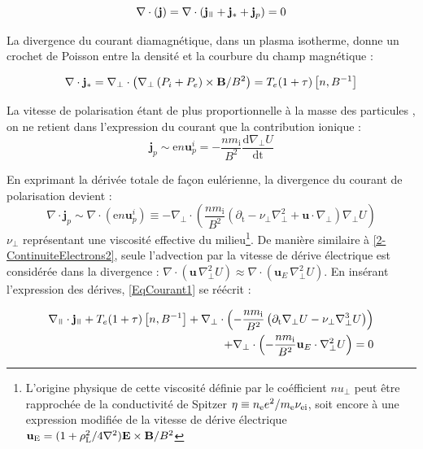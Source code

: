 \begin{refsection}
\begin{equation}
\label{EqCourant1}
\nabla\cdot\left(\mathbf{j}\right) = 
\nabla\cdot\left(\mathbf{j}_\para+\mathbf{j}_*+\mathbf{j}_p\right)
= 0
\end{equation}

La divergence du courant diamagnétique, dans un plasma isotherme, donne un
crochet de Poisson entre la densité et la courbure du champ magnétique :

\begin{equation}
\nabla\cdot\mathbf{j}_*=
\nabla_\perp\cdot\left(\nabla_\perp\left(
P_i+P_e\right)\times\mathbf{B}/B^2\right) =
T_e(1+\tau)\left[n,B^{{-1}}\right]
\end{equation}

La vitesse de polarisation étant de plus
proportionnelle à la masse des particules , on ne
retient dans l'expression du courant que la contribution ionique :
\begin{equation}
\mathbf{j}_p\sim\text{e}n\mathbf{u}^i_p=-\frac{nm_\text{i}}{B^2}\frac{\text{d}\nabla_\perp
U}{\text{dt}}
\end{equation}

En exprimant la dérivée totale de
façon eulérienne, la divergence du courant de polarisation devient :
\begin{equation}
\nabla\cdot\mathbf{j}_p\sim\nabla\cdot\left(\text{e}n\mathbf{u}^i_p\right)\equiv
-\nabla_\perp\cdot\left(\frac{nm_\text{i}}{B^2}\left(\partial_\text{t} -
\nu_\perp \nabla_\perp^2 +
\mathbf{u}\cdot\nabla_\perp\right)\nabla_\perp U\right)
\end{equation}
$\nu_\perp$ représentant une viscosité effective du milieu\footnote{L'origine
physique de cette viscosité définie par le coéfficient $nu_\perp$ peut être
rapprochée de la conductivité de Spitzer $\eta\equiv
n_\text{e}e^{{2}}/m_\text{e}\nu_\text{ei}$, soit encore à une expression
modifiée de la vitesse de dérive électrique
$\mathbf{u}_\text{E}=(1+\rho_\text{L}^{{2}}/4\nabla^{{2}})\mathbf{E}\times\mathbf{B}/B^{{2}}$}.
De manière similaire à \eqref{2-ContinuiteElectrons2}, seule l'advection par la
vitesse de dérive électrique est considérée dans la divergence : 
$\nabla\cdot\left(\mathbf{u}\,\nabla_\perp^2 U\right)
\approx\nabla\cdot\left(\mathbf{u}_E\,\nabla_\perp^2 U\right)$.
En insérant l'expression des dérives, \eqref{EqCourant1} se réécrit :

\begin{equation}\begin{split}
\label{EqCourant2}
\nabla_\para\cdot\mathbf{j}_\para +
T_e(1+\tau)\left[n,B\puissance{-1}\right] + \nabla_\perp\cdot\left(-\frac{nm_\text{i}}{B^2}\left(\partial_\text{t}\nabla_\perp
U - \nu_\perp \nabla_\perp^3 U \right)\right) \\+
\nabla_\perp\cdot\left(-\frac{nm_\text{i}}{B^2}\mathbf{u}_E\cdot\nabla_\perp^2
U\right)=0
\end{split}
\end{equation}


\end{refsection}
